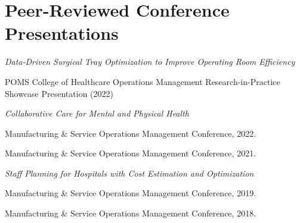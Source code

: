 \documentclass[11pt,a4paper]{article}
\renewenvironment{itemize}{
	\begin{list}{}{
			\setlength{\leftmargin}{1.5em}
		}
	}{
\end{list}
}
\begin{document}
	\section*{\textbf{Peer-Reviewed Conference Presentations}}
	\begin{itemize}

		\item \emph{Data-Driven Surgical Tray Optimization to Improve Operating Room Efficiency}
		\begin{itemize}
			\item POMS College of Healthcare Operations Management Research-in-Practice Showcase Presentation (2022)
		\end{itemize}

		\item \emph{Collaborative Care for Mental and Physical Health}
			\begin{itemize}
				\item Manufacturing \& Service Operations Management Conference, 2022.
			\item Manufacturing \& Service Operations Management Conference, 2021.
		\end{itemize}
		\item \emph{Staff Planning for Hospitals with Cost Estimation and
			Optimization}
		\begin{itemize}
			\item Manufacturing \& Service Operations Management Conference, 2019.
			\item Manufacturing \& Service Operations Management Conference, 2018.

		\end{itemize}
	\end{itemize}
\end{document}
